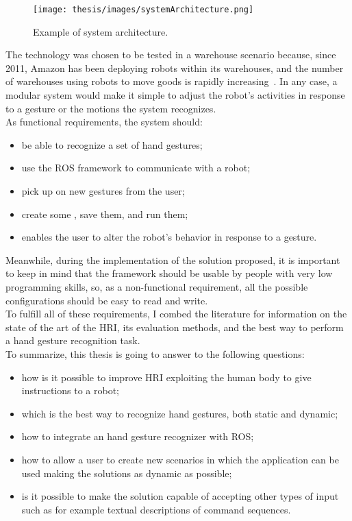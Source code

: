 \documentclass[../thesis.tex]{subfiles}
\begin{document}
\begin{figure}
  \centering
  \texttt{[image: thesis/images/systemArchitecture.png]}
  \caption{Example of system architecture.}
  \label{fig:systemArchitecture}
\end{figure}

The technology was chosen to be tested in a warehouse scenario because, since 2011, Amazon has been deploying robots within its warehouses, and the number of warehouses using robots to move goods is rapidly increasing~\cite{paper:bogue2016}. In any case, a modular system would make it simple to adjust the robot's activities in response to a gesture or the motions the system recognizes.\\

As functional requirements, the system should:
\begin{itemize}
    \item be able to recognize a set of hand gestures;
    \item use the \gls{ROS} framework to communicate with a robot;
    \item pick up on new gestures from the user;
    \item create some , save them, and run them;
    \item enables the user to alter the robot's behavior in response to a gesture.
\end{itemize}
Meanwhile, during the implementation of the solution proposed, it is important to keep in mind that the framework should be usable by people with very low programming skills, so, as a non-functional requirement, all the possible configurations should be easy to read and write.\\

To fulfill all of these requirements, I combed the literature for information on the state of the art of the \acrshort{HRI}, its evaluation methods, and the best way to perform a hand gesture recognition task.\\

To summarize, this thesis is going to answer to the following questions:
\begin{itemize}
    \item how is it possible to improve \gls{HRI} exploiting the human body to give instructions to a robot;
    \item which is the best way to recognize hand gestures, both static and dynamic;
    \item how to integrate an hand gesture recognizer with \gls{ROS};
    \item how to allow a user to create new scenarios in which the application can be used making the solutions as dynamic as possible;
    \item is it possible to make the solution capable of accepting other types of input such as for example textual descriptions of command sequences.
\end{itemize}
\end{document}
